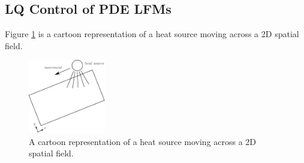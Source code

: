 \documentclass[journal]{IEEEtran}
\newcommand{\simo}[1]{{\color{red}#1}}
\begin{document}

%



\subsection{LQ Control of PDE LFMs}

Figure \ref{cartoon:heatpde} is a cartoon representation of a heat source moving across a 2D spatial field.

\begin{figure}[!t]
\centering
\includegraphics[width=0.3\textwidth]{heatpde}
\caption{A cartoon representation of a heat source moving across a 2D spatial field.}
\label{cartoon:heatpde}
\end{figure}
\end{document}
